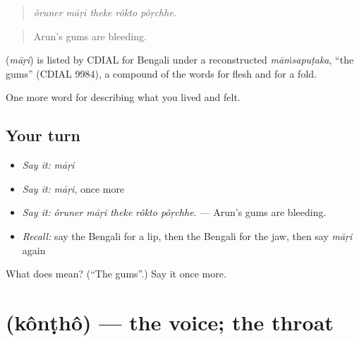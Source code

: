 \begin{quote}
    
\end{quote}

\begin{quote}
\emph{ôruner māṛi theke rôkto pôṛchhe.}
\end{quote}

\begin{quote}
Arun's gums are bleeding.
\end{quote}

\begin{cousinweb}
\textbf{} (\emph{māṛi}) is listed by CDIAL for Bengali under a reconstructed \emph{māṁsapuṭaka}, \textquotedblleft{}the gums\textquotedblright{} (CDIAL 9984), a compound of the words for flesh and for a fold.
\end{cousinweb}

\begin{grammarlens}[title={What you've built}]
One more word for describing what you lived and felt.
\end{grammarlens}

\subsection*{Your turn}
\begin{itemize}
\raggedright
  \item \emph{Say it:} \emph{māṛi}
  \item \emph{Say it:} \emph{māṛi}, once more
  \item \emph{Say it:} \emph{ôruner māṛi theke rôkto pôṛchhe.} — Arun's gums are bleeding.
  \item \emph{Recall:} say the Bengali for a lip, then the Bengali for the jaw, then say \emph{māṛi} again
\end{itemize}

\begin{tcolorbox}[breakable,colback=teal!4,colframe=teal!35!black,title={Before you move on}]
What does  mean? (\textquotedblleft{}The gums\textquotedblright{}.) Say it once more.
\end{tcolorbox}
\section[\texorpdfstring{\bn{কণ্ঠ} (kônṭhô)}{কণ্ঠ (kônṭhô)}]{ (kônṭhô) — the voice; the throat}

\label{lesson:BN-C467-kontho}



